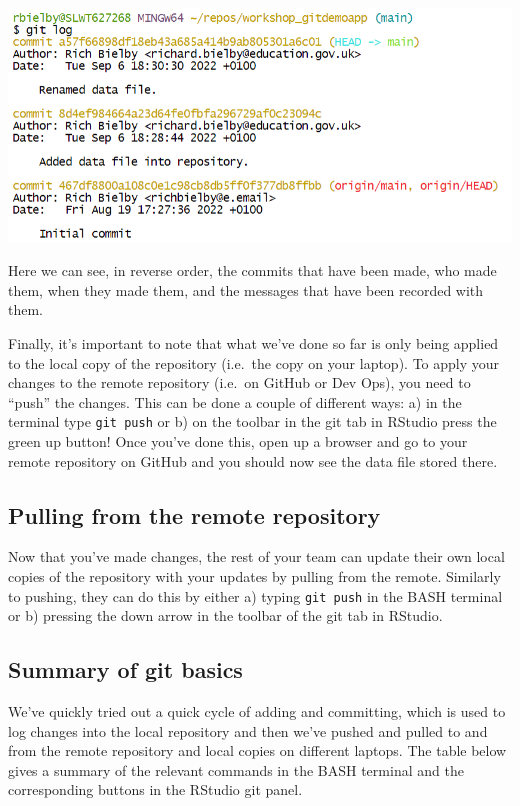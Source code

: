 \documentclass[
  12pt,
]{article}
\begin{document}
\begin{center}\includegraphics[width=0.8\linewidth]{images/gitdemo/gitdemo-gitlog-2} \end{center}

Here we can see, in reverse order, the commits that have been made, who
made them, when they made them, and the messages that have been recorded
with them.

Finally, it's important to note that what we've done so far is only
being applied to the local copy of the repository (i.e.~the copy on your
laptop). To apply your changes to the remote repository (i.e.~on GitHub
or Dev Ops), you need to ``push'' the changes. This can be done a couple
of different ways: a) in the terminal type \texttt{git\ push} or b) on
the toolbar in the git tab in RStudio press the green up button! Once
you've done this, open up a browser and go to your remote repository on
GitHub and you should now see the data file stored there.

\hypertarget{pulling-from-the-remote-repository}{%
\subsection{Pulling from the remote
repository}\label{pulling-from-the-remote-repository}}

Now that you've made changes, the rest of your team can update their own
local copies of the repository with your updates by pulling from the
remote. Similarly to pushing, they can do this by either a) typing
\texttt{git\ push} in the BASH terminal or b) pressing the down arrow in
the toolbar of the git tab in RStudio.

\hypertarget{summary-of-git-basics}{%
\subsection{Summary of git basics}\label{summary-of-git-basics}}

We've quickly tried out a quick cycle of adding and committing, which is
used to log changes into the local repository and then we've pushed and
pulled to and from the remote repository and local copies on different
laptops. The table below gives a summary of the relevant commands in the
BASH terminal and the corresponding buttons in the RStudio git panel.
\end{document}
